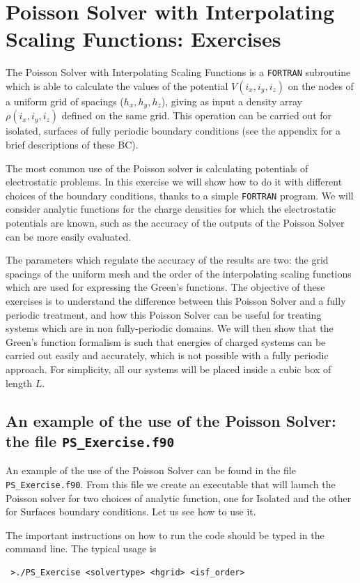\documentclass[a4paper]{article}
\begin{document}
\section*{Poisson Solver with Interpolating Scaling Functions: Exercises}
The Poisson Solver with Interpolating Scaling Functions is a \texttt{FORTRAN} subroutine which is able to calculate the values of the potential $V(i_x,i_y,i_z)$ on the nodes of a uniform grid of spacings ($h_x,h_y,h_z$), giving as input a density array $\rho(i_x,i_y,i_z)$ defined on the same grid. This operation can be carried out for isolated, surfaces of fully periodic boundary conditions (see the appendix for a brief descriptions of these BC).

The most common use of the Poisson solver is calculating potentials of electrostatic problems. In this exercise we will show how to do it with different choices of the boundary conditions, thanks to a simple \texttt{FORTRAN} program.
We will consider analytic functions for the charge densities for which the electrostatic potentials are known, such as the accuracy of the outputs of the Poisson Solver can be more easily evaluated.

The parameters which regulate the accuracy of the results are two: the grid spacings of the uniform mesh and the order of the interpolating scaling functions which are used for expressing the Green's functions. The objective of these exercises is to understand the difference between this Poisson Solver and a fully periodic treatment, and how this Poisson Solver can be useful for treating systems which are in non fully-periodic domains.
We will then show that the Green's function formalism is such that energies of charged systems can be carried out easily and accurately, which is not possible with a fully periodic approach.
For simplicity, all our systems will be placed inside a cubic box of length $L$.

\subsection*{An example of the use of the Poisson Solver: the file \texttt{PS\_Exercise.f90}}
An example of the use of the Poisson Solver can be found in the file \texttt{PS\_Exercise.f90}.
From this file we create an executable that will launch the Poisson solver for two choices of analytic function, one for Isolated and the other for Surfaces boundary conditions.
Let us see how to use it.

The important instructions on how to run the code should be typed in the command line.
The typical usage is
\begin{verbatim}
 >./PS_Exercise <solvertype> <hgrid> <isf_order>
\end{verbatim}
\end{document}
